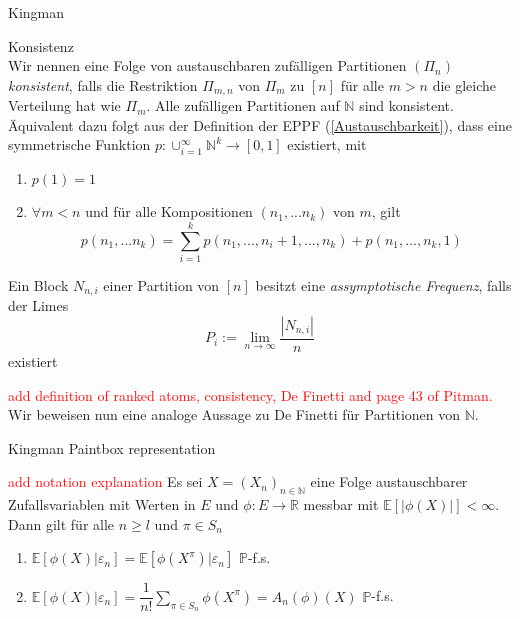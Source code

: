 \begin{section}{Kingman}
\begin{Definition}{Konsistenz}\\
    Wir nennen eine Folge von austauschbaren zufälligen Partitionen $(\Pi_n)$ \textit{konsistent}, falls die Restriktion $\Pi_{m,n}$ von $\Pi_m$ zu $[n]$ für alle $m > n$ die gleiche Verteilung hat wie $\Pi_m$. Alle zufälligen Partitionen auf $\mathbb{N}$ sind konsistent.
    Äquivalent dazu folgt aus der Definition der EPPF (\ref{Austauschbarkeit}), dass eine symmetrische Funktion  $p: \cup_{i=1}^{\infty} \mathbb{N}^k \to [0,1]$ existiert, mit 
    \begin{enumerate}
        \item $p(1) = 1$
        \item $\forall m < n$ und für alle Kompositionen $(n_1,...n_k)$ von $m$, gilt 
        \[ 
        p(n_1, ... n_k) = \sum_{i=1}^{k}p(n_1, ..., n_i + 1, ..., n_k) + p(n_1,...,n_k,1)
        \]
    \end{enumerate}
\end{Definition}
\begin{Definition}
    Ein Block $N_{n,i}$ einer Partition von $[n]$ besitzt eine \textit{assymptotische Frequenz}, falls der Limes 
    \[
    P_i := \lim_{n \to \infty}\frac{|N_{n,i}|}{n}
    \] 
    existiert
\end{Definition}
\textcolor{red}{add definition of ranked atoms, consistency, De Finetti and page 43 of Pitman.}
\\
Wir beweisen nun eine analoge Aussage zu De Finetti für Partitionen von $\mathbb{N}$.
\begin{section}{Kingman Paintbox representation}
\begin{lemma}
    \cite[Lemma 8.11]{NeiningerHS}
    \textcolor{red}{add notation explanation}
    Es sei $X = (X_{n})_{n \in \mathbb{N}}$ eine Folge austauschbarer Zufallsvariablen mit Werten in $E$ und $\phi: E \to \mathbb{R}$ messbar mit $\mathbb{E}[|\phi(X)|]< \infty$. Dann gilt für alle $n \geq l$ und $\pi \in S_n$
    \begin{enumerate}
        \item $ \mathbb{E}[\phi(X)|\varepsilon_n] =\mathbb{E}[\phi(X^\pi)|\varepsilon_n]  $  $\mathbb{P}$-f.s.
        \item $ \mathbb{E}[\phi(X)|\varepsilon_n] = \dfrac{1}{n!}\sum_{\pi \in S_n} \phi(X^\pi) = A_n(\phi)(X)$ $\mathbb{P}$-f.s.
    \end{enumerate}
\end{lemma}

\end{section}
\end{section}
